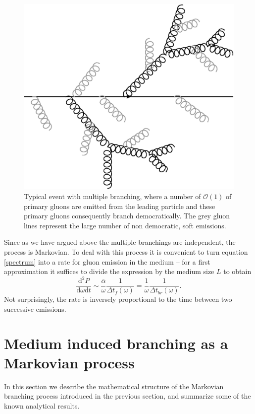 \documentclass[a4paper,12pt]{article}
\numberwithin{equation}{section}
\begin{document}
\begin{figure}
\begin{center}
\includegraphics[width=0.5\linewidth]{democraticbranch.eps}
\end{center}
\vspace*{-20pt}
\caption{Typical event with multiple branching, where a number of $\mathcal{O}(1)$ of primary gluons are emitted from the leading particle and these primary gluons consequently branch democratically. The grey gluon lines represent the large number of non democratic, soft emissions.}\label{democraticbranch}
\end{figure}



Since as we have argued above the multiple branchings are independent, the process is Markovian. To deal with this process it is convenient to turn equation \eqref{spectrum} into a rate for gluon emission in the medium -- for a first approximation it suffices to divide the expression by the medium size $L$ to obtain
\begin{equation}\label{rate}
\frac{\mathrm{d}^2P}{\mathrm{d}\omega \mathrm{d}t} \sim \frac{\bar{\alpha}}{\omega}\frac{1}{\Delta t_f(\omega)} = \frac{1}{\omega}\frac{1}{\Delta t_{br}(\omega)}.
\end{equation}
Not surprisingly, the rate is inversely proportional to the time between two successive emissions. 



\section{Medium induced branching as a Markovian process}\label{stochastic}
In this section we describe the mathematical structure of the Markovian branching process introduced in the previous section, and summarize some of the known analytical results.
\end{document}
